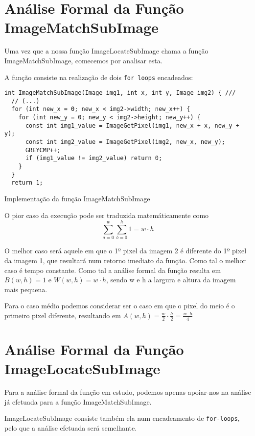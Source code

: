 \section{Análise Formal da Função ImageMatchSubImage}
\renewcommand{\listingscaption}{Código:}
Uma vez que a nossa função ImageLocateSubImage chama a
função ImageMatchSubImage, comecemos por analisar esta.

A função consiste na realização de dois \verb|for loops|
encadeados:
\begin{listing}[H]
\begin{verbatim}
int ImageMatchSubImage(Image img1, int x, int y, Image img2) { ///
  // (...)
  for (int new_x = 0; new_x < img2->width; new_x++) {
    for (int new_y = 0; new_y < img2->height; new_y++) {
      const int img1_value = ImageGetPixel(img1, new_x + x, new_y + y);
      const int img2_value = ImageGetPixel(img2, new_x, new_y);
      GREYCMP++;
      if (img1_value != img2_value) return 0;
    }
  }
  return 1;
\end{verbatim}
\caption{Implementação da função ImageMatchSubImage}
\end{listing}

O pior caso da execução pode ser traduzida matemáticamente como 
\begin{equation}
\sum_{a=0}^{w}\sum_{b=0}^{h}1 = w \cdot h 
\end{equation}

O melhor caso será aquele em que o 1º pixel da imagem
2 é diferente do 1º pixel da imagem 1, que resultará num
retorno imediato da função. Como tal o melhor caso é tempo
constante.
Como tal a análise formal da função resulta em $B(w,h) = 1$
e $W(w,h) = w \cdot h$, sendo w e h a largura e altura da
imagem mais pequena.

Para o caso médio podemos considerar ser o caso em que o
pixel do meio é o primeiro pixel diferente, resultando em
$A(w,h) = \frac{w}{2} \cdot \frac{h}{2} = \frac{w \cdot h}{4} $

\section{Análise Formal da Função ImageLocateSubImage}

Para a análise formal da função em estudo, podemos apenas
apoiar-nos na análise já efetuada para a função
ImageMatchSubImage.

ImageLocateSubImage consiste também ela num encadeamento de
\verb|for-loops|, pelo que a análise efetuada será
semelhante.

